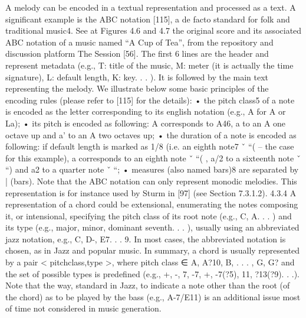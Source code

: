 A melody can be encoded in a textual representation and processed as a text. A significant example is the ABC notation [115], a de facto standard for folk and traditional music4. See at Figures 4.6 and 4.7 the original score and its associated ABC notation of a music named “A Cup of Tea”, from the repository and discussion platform The Session [56]. The first 6 lines are the header and represent metadata (e.g., T: title of the music, M:
meter (it is actually the time signature), L: default length, K: key. . . ). It is followed by the main text representing the melody. We illustrate below some basic principles of the encoding rules (please refer to [115] for the details):
• the pitch class5 of a note is encoded as the letter corresponding to its english notation (e.g., A for A or La);
• its pitch is encoded as following: A corresponds to A46, a to an A one octave up and a’ to an A two octaves up;
• the duration of a note is encoded as following: if default length is marked as 1/8 (i.e. an eighth note7
ˇ “( – the case for this example), a corresponds to an eighth note ˇ “( , a/2 to a sixteenth note ˇ “) and a2 to a quarter note ˇ “;
• measures (also named bars)8 are separated by | (bars). Note that the ABC notation can only represent monodic melodies. This representation
is for instance used by Sturm in [97] (see Section 7.3.1.2). 4.3.4
A representation of a chord could be extensional, enumerating the notes composing it, or intensional, specifying the pitch class of its root note (e.g., C, A. . . ) and its type (e.g., major, minor, dominant seventh. . . ), usually using an abbreviated jazz notation, e.g., C, D-, E7. . . 9. In most cases, the abbreviated notation is chosen, as in Jazz and popular music. In summary, a chord is usually represented by a pair < pitchclass,type >, where pitch
class ∈ {A, A?10, B, . . . , G, G?} and the set of possible types is predefined (e.g., {+, -, 7, -7, +, -7(?5), 11, ?13(?9). . .}). Note that the way, standard in Jazz, to indicate a note other than the root (of the chord) as to be played by the bass (e.g., A-7/E11) is an additional issue most of time not considered in music generation.

